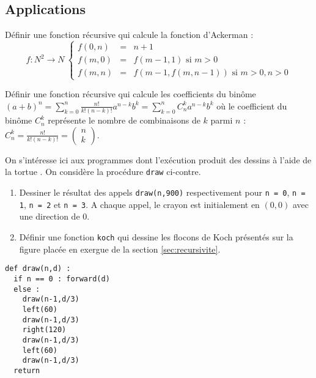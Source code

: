 \subsection{Applications}

\begin{question}
Définir une fonction récursive qui calcule la fonction d'Ackerman : 
$$
{f : N^2 \rightarrow N}\ 
\left\{\begin{array}{lll}
f{(0,n)} & = & n+1\\
f{(m,0)} & = & f{(m-1,1)}\mbox{\ si\ } m > 0\\
f{(m,n)} & = & f{(m-1,f{(m,n-1)})}\mbox{\ si\ } m > 0, n > 0
\end{array}\right.
$$
\end{question}

\begin{question}
Définir une fonction récursive qui calcule les coefficients du binôme 
$\displaystyle (a+b)^n = \sum_{k=0}^n \frac{n!}{k!(n-k)!}a^{n-k}b^k = \sum_{k=0}^n C_n^k a^{n-k}b^k$ où le coefficient du binôme $\displaystyle C_n^k$ représente le nombre de combinaisons de $k$ parmi $n$ :
$\displaystyle C_n^k = \frac{n!}{k!(n-k)!} = \left(\begin{array}{c}
n\\k
\end{array}\right)$.
\end{question}

\begin{question}[récursivité : flocons de Koch]\mbox{}

\noindent \begin{minipage}[t]{7.5cm}
On s'intéresse ici aux programmes dont l'exécution produit des dessins
à l'aide de la tortue \logo.
On considère la procédure \texttt{draw} ci-contre.
\begin{enumerate}
\item Dessiner le résultat des appels \texttt{draw(n,900)} 
	respectivement pour \texttt{n = 0}, \texttt{n = 1}, \texttt{n = 2} et \texttt{n = 3}. 
	A chaque appel, le crayon est initialement en $(0,0)$ avec une direction de $0$.
\item Définir une fonction \texttt{koch} qui dessine les flocons de Koch présentés
	sur la figure placée en exergue de la section \ref{sec:recursivite}.
\end{enumerate}
\end{minipage}
\hfill
\begin{minipage}[t]{7cm}
\begin{lstlisting}
def draw(n,d) :
  if n == 0 : forward(d)
  else :
    draw(n-1,d/3)
    left(60)
    draw(n-1,d/3)
    right(120)
    draw(n-1,d/3)
    left(60)
    draw(n-1,d/3)
  return
\end{lstlisting}
\end{minipage}
\end{question}

